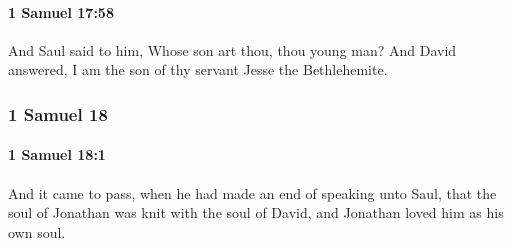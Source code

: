 		\paragraph{1 Samuel 17:58} %
			\label{1SAMUEL-17-58}

			And Saul said to him, Whose son art thou, thou young man? And David answered, I am the son of thy servant Jesse the Bethlehemite.

			
	\subsubsection{1 Samuel 18} %
		\label{1SAMUEL-18}

		\paragraph{1 Samuel 18:1} %
			\label{1SAMUEL-18-1}

			And it came to pass, when he had made an end of speaking unto Saul, that the soul of Jonathan was knit with the soul of David, and Jonathan loved him as his own soul.

